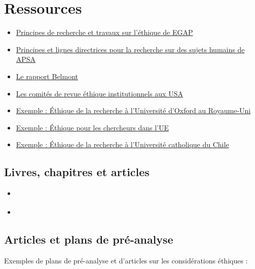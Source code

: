 \documentclass[
  12pt,
]{book}
\begin{document}
\hypertarget{ressources-8}{%
\section{Ressources}\label{ressources-8}}

\begin{itemize}
\item
  \href{https://egap.org/ethics/}{Principes de recherche et travaux sur l'éthique de EGAP}
\item
  \href{https://connect.apsanet.org/hsr/principles-and-guidance/}{Principes et lignes directrices pour la recherche sur des sujets humains de APSA}
\item
  \href{https://www.hhs.gov/ohrp/regulations-and-policy/belmont-report/index.html}{Le rapport Belmont}
\item
  \href{https://www.youtube.com/watch?v=U8fme1boEbE}{Les comités de revue éthique institutionnels aux USA}
\item
  \href{https://researchsupport.admin.ox.ac.uk/governance/ethics}{Exemple : Éthique de la recherche à l'Université d'Oxford au Royaume-Uni}
\item
  \href{https://ec.europa.eu/research/participants/data/ref/fp7/89888/ethics-for-researchers_en.pdf}{Exemple : Éthique pour les chercheurs dans l'UE}
\item
  \href{http://eticayseguridad.uc.cl/}{Exemple : Éthique de la recherche à l'Université catholique du Chile}
\end{itemize}

\hypertarget{livres-chapitres-et-articles-6}{%
\subsection{Livres, chapitres et articles}\label{livres-chapitres-et-articles-6}}

\begin{itemize}
\item
  \autocite{Asieduetal2021ethics}
\item
  \autocite{Evans2021ethics}
\end{itemize}

\hypertarget{articles-et-plans-de-pruxe9-analyse}{%
\subsection{Articles et plans de pré-analyse}\label{articles-et-plans-de-pruxe9-analyse}}

Exemples de plans de pré-analyse et d'articles sur les considérations éthiques :
\end{document}
